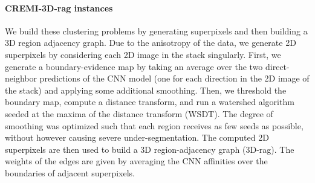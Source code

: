 \paragraph{CREMI-3D-rag instances} 
We build these clustering problems by generating superpixels and then building a 3D region adjacency graph.
Due to the anisotropy of the data, we generate 2D superpixels by considering each 2D image in the stack singularly.
First, we generate a boundary-evidence map by taking an average over the two direct-neighbor predictions of the CNN model (one for each direction in the 2D image of the stack) and applying some additional smoothing. Then, we threshold the boundary map, compute a distance transform, and run a watershed algorithm seeded at the maxima of the distance transform (WSDT). The degree of smoothing was optimized such that each region receives as few seeds as possible, without however causing severe under-segmentation. 
The computed 2D superpixels are then used to build a 3D region-adjacency graph (3D-rag). The weights of the edges are given by averaging the CNN affinities over the boundaries of adjacent superpixels. 




